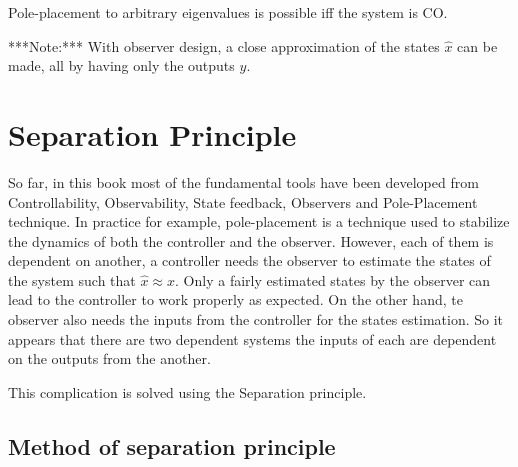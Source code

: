 Pole-placement to arbitrary eigenvalues is possible iff the system is
CO.

***Note:*** With observer design, a close approximation of the states
$\hat{x}$ can be made, all by having only the outputs $y$.

\section{Separation Principle}

So far, in this book most of the fundamental tools have been developed from Controllability, Observability, State feedback, Observers and Pole-Placement technique. In practice for example, pole-placement is a technique used to stabilize the dynamics of both the controller and the observer. However, each of them is dependent on another, a controller needs the observer to estimate the states of the system such that $\hat{x} \approx x$. Only a fairly estimated states by the observer can lead to the controller to work properly as expected. On the other hand, te observer also needs the inputs from the controller for the states estimation. So it appears that there are two dependent systems the inputs of each are dependent on the outputs from the another.

This complication is solved using the Separation principle.

\subsection{Method of separation principle}


